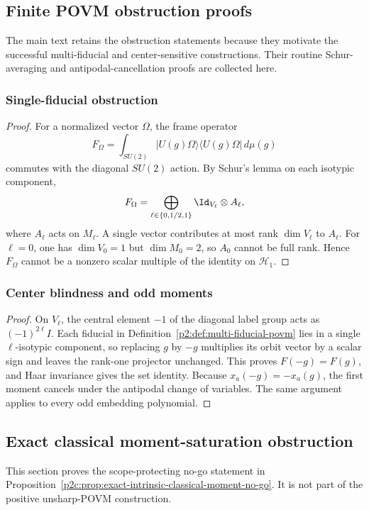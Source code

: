 \documentclass[11pt,a4paper]{article}
\begin{document}
\subsection{Finite POVM obstruction proofs}
\label{p2c:app:povm-obstruction-proofs}
The main text retains the obstruction statements because they motivate the
successful multi-fiducial and center-sensitive constructions.  Their routine
Schur-averaging and antipodal-cancellation proofs are collected here.

\subsubsection{Single-fiducial obstruction}
\begin{proof}
For a normalized vector $\Omega$, the frame operator
\[
F_\Omega=\int_{SU(2)} |U(g)\Omega\rangle\langle U(g)\Omega|\,d\mu(g)
\]
commutes with the diagonal $SU(2)$ action. By Schur's lemma
\cite{fulton1991representation} on each isotypic component,
\[
F_\Omega=\bigoplus_{\ell\in\{0,1/2,1\}}\Id_{V_\ell}\otimes A_\ell,
\]
where $A_\ell$ acts on $M_\ell$. A single vector contributes at most rank $\dim V_\ell$ to $A_\ell$. For $\ell=0$, one has $\dim V_0=1$ but $\dim M_0=2$, so $A_0$ cannot be full rank. Hence $F_\Omega$ cannot be a nonzero scalar multiple of the identity on $\mathcal H_1$.
\end{proof}

\subsubsection{Center blindness and odd moments}
\begin{proof}
On \(V_\ell\), the central element \(-1\) of the diagonal label group acts as
\((-1)^{2\ell}I\).  Each fiducial in
Definition~\ref{p2:def:multi-fiducial-povm} lies in a single
\(\ell\)-isotypic component, so replacing \(g\) by \(-g\) multiplies its
orbit vector by a scalar sign and leaves the rank-one projector unchanged.
This proves \(F(-g)=F(g)\), and Haar invariance gives the set identity.
Because \(x_a(-g)=-x_a(g)\), the first moment cancels under the antipodal
change of variables.  The same argument applies to every odd embedding
polynomial.
\end{proof}

\subsection{Exact classical moment-saturation obstruction}
\label{p2c:app:exact-moment-saturation-obstruction}
This section proves the scope-protecting no-go statement in
Proposition~\ref{p2c:prop:exact-intrinsic-classical-moment-no-go}.  It is not
part of the positive unsharp-POVM construction.
\end{document}

